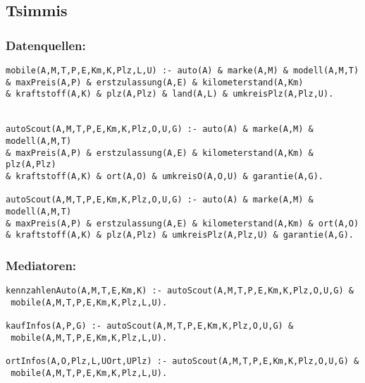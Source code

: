 \documentclass[a4paper]{article}
\begin{document}
\subsection*{Tsimmis}
\subsubsection*{Datenquellen:}
\begin{verbatim}
mobile(A,M,T,P,E,Km,K,Plz,L,U) :- auto(A) & marke(A,M) & modell(A,M,T) 
& maxPreis(A,P) & erstzulassung(A,E) & kilometerstand(A,Km) 
& kraftstoff(A,K) & plz(A,Plz) & land(A,L) & umkreisPlz(A,Plz,U).


autoScout(A,M,T,P,E,Km,K,Plz,O,U,G) :- auto(A) & marke(A,M) & modell(A,M,T) 
& maxPreis(A,P) & erstzulassung(A,E) & kilometerstand(A,Km) & plz(A,Plz)
& kraftstoff(A,K) & ort(A,O) & umkreisO(A,O,U) & garantie(A,G).

autoScout(A,M,T,P,E,Km,K,Plz,O,U,G) :- auto(A) & marke(A,M) & modell(A,M,T) 
& maxPreis(A,P) & erstzulassung(A,E) & kilometerstand(A,Km) & ort(A,O)
& kraftstoff(A,K) & plz(A,Plz) & umkreisPlz(A,Plz,U) & garantie(A,G).
\end{verbatim}

\subsubsection*{Mediatoren:}
\begin{verbatim}
kennzahlenAuto(A,M,T,E,Km,K) :- autoScout(A,M,T,P,E,Km,K,Plz,O,U,G) &
 mobile(A,M,T,P,E,Km,K,Plz,L,U).

kaufInfos(A,P,G) :- autoScout(A,M,T,P,E,Km,K,Plz,O,U,G) &
 mobile(A,M,T,P,E,Km,K,Plz,L,U).

ortInfos(A,O,Plz,L,UOrt,UPlz) :- autoScout(A,M,T,P,E,Km,K,Plz,O,U,G) &
 mobile(A,M,T,P,E,Km,K,Plz,L,U).

\end{verbatim}
\end{document}
